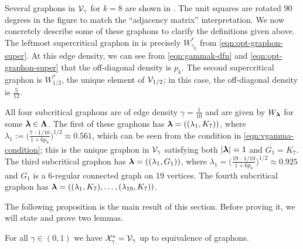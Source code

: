 \begin{example}\label{ex:graphon-clarification}
Several graphons in ${\mathcal V}_\gamma$ for $k=8$ are shown in . The unit squares are rotated 90 degrees in the figure to match the ``adjacency matrix'' interpretation. We now concretely describe some of these graphons to clarify the definitions given above. The leftmost supercritical graphon in  is precisely $W^\ast_{\gamma_k}$ from \eqref{eqn:opt-graphon-super}. At this edge density, we can see from \eqref{eqn:gammak-dfn} and \eqref{eqn:opt-graphon-super} that the off-diagonal density is $p_k$. The second supercritical graphon is $W^\ast_{1/2}$, the unique element of ${\mathcal V}_{1/2}$; in this case, the off-diagonal density is $\frac{5}{12}$.

All four subcritical graphons are of edge density $\gamma=\frac{1}{10}$ and are given by $W_{\boldsymbol{\lambda}}$ for some ${\boldsymbol{\lambda}}\in{\boldsymbol{\Lambda}}$. The first of these graphons has ${\boldsymbol{\lambda}}=((\lambda_1,K_7))$, where $\lambda_1:=\big(\frac{7\,\cdot\,1/10}{1+6p_8}\big)^{1/2}\approx0.561$, which can be seen from the condition in \eqref{eqn:vgamma-condition}; this is the unique graphon in ${\mathcal V}_\gamma$ satisfying both $|{\boldsymbol{\lambda}}|=1$ and $G_1=K_7$. The third subcritical graphon has ${\boldsymbol{\lambda}}=((\lambda_1,G_1))$, where $\lambda_1=\big(\frac{19\,\cdot\,1/10}{1+6p_8}\big)^{1/2}\approx0.925$ and $G_1$ is a 6-regular connected graph on 19 vertices. The fourth subcritical graphon has ${\boldsymbol{\lambda}}=((\lambda_1,K_7),\dots,(\lambda_{19},K_7))$.
\end{example}

The following proposition is the main result of this section. Before proving it, we will state and prove two lemmas.

\begin{proposition}\label{prop:graphon-char-fixed-gamma}
For all $\gamma\in(0,1)$ we have ${\mathcal X}^\ast_\gamma={\mathcal V}_\gamma$ up to equivalence of graphons.
\end{proposition}

